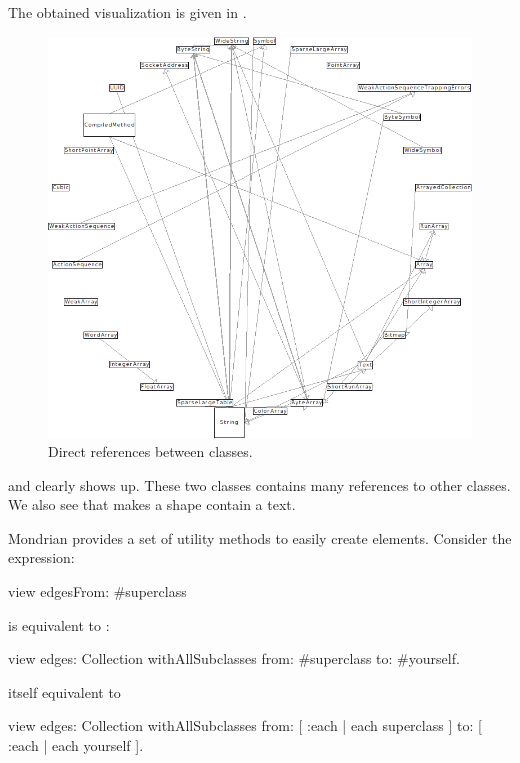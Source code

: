 \documentclass[a4paper,10pt,twoside]{book}
\begin{document}
The obtained visualization is given in .

\begin{figure}[htbp]
\centerline{\includegraphics[width=\linewidth]{classDependencies}}
\caption{Direct references between classes.}
\label{fig:classDependencies}
\end{figure}

 and  clearly shows up. These two classes contains many references to other classes.
We also see that  makes a shape contain a text.

Mondrian provides a set of utility methods to easily create elements.  Consider the expression:
\begin{code}{}
view edgesFrom: #superclass
\end{code}

 is equivalent to  :

\begin{code}{}
view edges: Collection withAllSubclasses from: #superclass to: #yourself.
\end{code}
itself equivalent to
\begin{code}{}
view 
  edges: Collection withAllSubclasses 
  from: [ :each | each superclass ] 
  to: [ :each | each yourself ].
\end{code}
\end{document}
